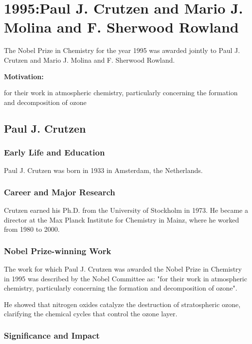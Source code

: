 \chapter{1995:Paul J. Crutzen and Mario J. Molina and F. Sherwood Rowland}

\label{chap:chemistry1995}

The Nobel Prize in Chemistry for the year 1995 was awarded jointly to Paul J. Crutzen and Mario J. Molina and F. Sherwood Rowland.

\textbf{Motivation:}

for their work in atmospheric chemistry, particularly concerning the formation and decomposition of ozone

\section{Paul J. Crutzen}

\subsection*{Early Life and Education}

Paul J. Crutzen was born in 1933 in Amsterdam, the Netherlands.

\subsection*{Career and Major Research}

Crutzen earned his Ph.D. from the University of Stockholm in 1973. He became a director at the Max Planck Institute for Chemistry in Mainz, where he worked from 1980 to 2000.

\subsection*{Nobel Prize-winning Work}

The work for which Paul J. Crutzen was awarded the Nobel Prize in Chemistry in 1995 was described by the Nobel Committee as: "for their work in atmospheric chemistry, particularly concerning the formation and decomposition of ozone".

He showed that nitrogen oxides catalyze the destruction of stratospheric ozone, clarifying the chemical cycles that control the ozone layer.

\subsection*{Significance and Impact}

